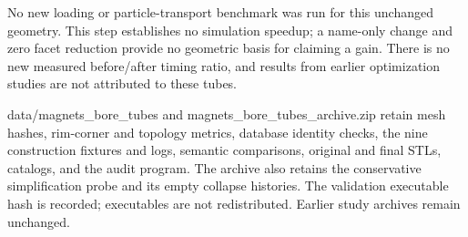 No new loading or particle-transport benchmark was run for this unchanged geometry. This step establishes no
simulation speedup; a name-only change and zero facet reduction provide no geometric basis for claiming a
gain. There is no new measured before/after timing ratio, and results from earlier optimization studies are
not attributed to these tubes.

data/magnets\_bore\_tubes and magnets\_bore\_tubes\_archive.zip retain mesh hashes, rim-corner and topology
metrics, database identity checks, the nine construction fixtures and logs, semantic comparisons, original and
final STLs, catalogs, and the audit program. The archive also retains the conservative simplification probe
and its empty collapse histories. The validation executable hash is recorded; executables are not
redistributed. Earlier study archives remain unchanged.
